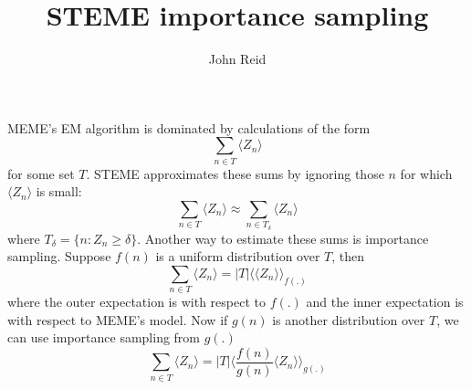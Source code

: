 \documentclass[a4paper]{article}
\title{STEME importance sampling}
\author{John Reid}
\begin{document}
MEME's EM algorithm is dominated by calculations of the form
\[
  \sum_{n \in T} \langle Z_n \rangle
\]
for some set $T$. STEME approximates these sums by ignoring those $n$ for
which $\langle Z_n \rangle$ is small:
\[
  \sum_{n \in T} \langle Z_n \rangle \approx
  \sum_{n \in T_\delta} \langle Z_n \rangle
\] where $T_\delta = \{ n : Z_n \ge \delta \}$.
Another way to estimate these sums is importance sampling. Suppose $f(n)$
is a uniform distribution over $T$, then
\[
  \sum_{n \in T} \langle Z_n \rangle
  = |T| \bigg\langle \langle Z_n \rangle \bigg\rangle_{f(.)}
\]
where the outer expectation is with respect to $f(.)$ and the inner expectation
is with respect to MEME's model. Now if $g(n)$ is another distribution over $T$,
we can use importance sampling from $g(.)$
\[
  \sum_{n \in T} \langle Z_n \rangle
  = |T| \bigg \langle \frac{f(n)}{g(n)} \langle Z_n \rangle \bigg\rangle_{g(.)}
\]

\end{document}
